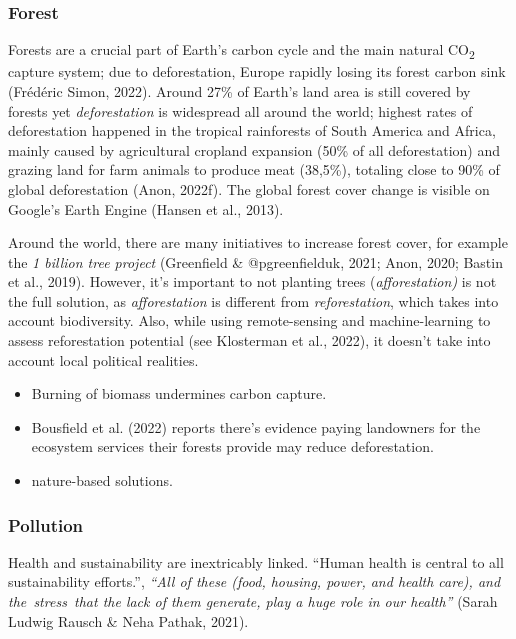 \documentclass[
  letterpaper,
  DIV=11,
  numbers=noendperiod]{scrartcl}
\providecommand{\tightlist}{%
  \setlength{\itemsep}{0pt}\setlength{\parskip}{0pt}}\usepackage{longtable,booktabs,array}
\begin{document}
\subsubsection{Forest}\label{forest}

Forests are a crucial part of Earth's carbon cycle and the main natural
CO\textsubscript{2} capture system; due to deforestation, Europe rapidly
losing its forest carbon sink (Frédéric Simon, 2022). Around 27\% of
Earth's land area is still covered by forests yet \emph{deforestation}
is widespread all around the world; highest rates of deforestation
happened in the tropical rainforests of South America and Africa, mainly
caused by agricultural cropland expansion (50\% of all deforestation)
and grazing land for farm animals to produce meat (38,5\%), totaling
close to 90\% of global deforestation (Anon, 2022f). The global forest
cover change is visible on Google's Earth Engine (Hansen et al., 2013).

Around the world, there are many initiatives to increase forest cover,
for example the \emph{1 billion tree project} (Greenfield \&
@pgreenfielduk, 2021; Anon, 2020; Bastin et al., 2019). However, it's
important to not planting trees (\emph{afforestation)} is not the full
solution, as \emph{afforestation} is different from
\emph{reforestation}, which takes into account biodiversity. Also, while
using remote-sensing and machine-learning to assess reforestation
potential (see Klosterman et al., 2022), it doesn't take into account
local political realities.

\begin{itemize}
\tightlist
\item
  Burning of biomass undermines carbon capture.
\item
  Bousfield et al. (2022) reports there's evidence paying landowners for
  the ecosystem services their forests provide may reduce deforestation.
\item
  nature-based solutions.
\end{itemize}

\subsubsection{Pollution}\label{pollution}

Health and sustainability are inextricably linked. ``Human health is
central to all sustainability efforts.'', \emph{``All of these (food,
housing, power, and health care), and the~stress~that the lack of them
generate, play a huge role in our health''} (Sarah Ludwig Rausch \& Neha
Pathak, 2021).
\end{document}
